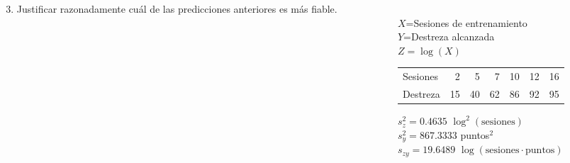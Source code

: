 \documentclass[aspectratio=149,10pt,xcolor=dvipsnames,t]{beamer}
\begin{document}
\begin{frame}
\begin{columns}
\begin{column}[T]{0.5\textwidth}
\begin{enumerate}
\setcounter{enumi}{2}
\item Justificar razonadamente cuál de las predicciones anteriores es más fiable. 
\end{enumerate}
\end{column}
\begin{column}[T]{0.5\textwidth}
\\
$X$=Sesiones de entrenamiento\\
$Y$=Destreza alcanzada\\
$Z=\log(X)$\\
\medskip
\begin{tabular}{lrrrrrr}
\hline
Sesiones & 2 & 5 & 7 & 10 & 12 & 16\\
Destreza & 15 & 40 & 62 & 86 & 92 & 95\\
\hline
\end{tabular}

\medskip
$s_z^2=0.4635$ $\log^2(\text{sesiones})$\\
$s_y^2 = 867.3333$ puntos$^2$\\
$s_{zy} = 19.6489$ $\log(\text{sesiones}\cdot\text{puntos})$
\end{column}
\end{columns}
\end{frame}
\end{document}
